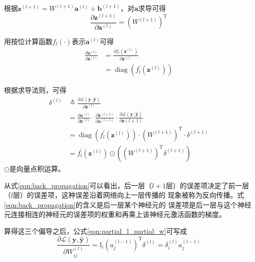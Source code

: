 根据$\mathbf{z}^{(l+1)}=W^{(l+1)} \mathbf{a}^{(l)}+\mathbf{b}^{(l+1)}$，对$\mathbf{a}$求导可得
\begin{equation} 
\frac{\partial \mathbf{z}^{(l+1)}}{\partial \mathbf{a}^{(l)}}=\left(W^{(l+1)}\right)^{\mathrm{T}}
 \end{equation}

用按位计算函数$f_{l}(\cdot)$表示$\mathbf{a}^{(l)}$可得
\begin{equation} 
\begin{aligned} \frac{\partial \mathbf{a}^{(l)}}{\partial \mathbf{z}^{(l)}} &=\frac{\partial f_{l}\left(\mathbf{z}^{(l)}\right)}{\partial \mathbf{z}^{(l)}} \\ &=\operatorname{diag}\left(f_{l}^{\prime}\left(\mathbf{z}^{(l)}\right)\right) \end{aligned}
 \end{equation}

根据求导法则，可得
\begin{equation} 
\label{eqn:back_propagation}
\begin{aligned} \delta^{(l)} & \triangleq \frac{\partial \mathcal{L}(\mathbf{y}, \hat{\mathbf{y}})}{\partial \mathbf{z}^{(l)}} \\ 
&=\frac{\partial \mathbf{a}^{(l)}}{\partial \mathbf{z}^{(l)}} \cdot \frac{\partial \mathbf{z}^{(l+1)}}{\partial \mathbf{a}^{(l+1)}} \cdot \frac{\partial \mathcal{L}(\mathbf{y}, \hat{\mathbf{y}})}{\partial \mathbf{z}(l+1)} \\ 
&=\operatorname{diag}\left(f_{l}^{\prime}\left(\mathbf{z}^{(l)}\right)\right) \cdot\left(W^{(l+1)}\right)^{\mathrm{T}} \cdot \delta^{(l+1)} \\ &=f_{l}^{\prime}\left(\mathbf{z}^{(l)}\right) \odot\left(\left(W^{(l+1)}\right)^{\mathrm{T}} \delta^{(l+1)}\right) \end{aligned}
\end{equation}
$\odot$是向量点积运算。

从式\ref{eqn:back_propagation}可以看出，后一层（$l+1$层）的误差项决定了前一层（$l$层）的误差项，这种误差沿着网络向上一层传播的
现象被称为反向传播。式\ref{eqn:back_propagation}的含义是后一层某个神经元的
误差项是后一层与这个神经元连接相连的神经元的误差项的权重和再乘上该神经元激活函数的梯度。

算得这三个偏导之后，公式\ref{eqn:partial_l_partial_w}可写成
\begin{equation} 
\frac{\partial \mathcal{L}(\mathbf{y}, \hat{\mathbf{y}})}{\partial W_{i j}^{(l)}}=\mathbb{I}_{i}\left(a_{j}^{(l-1)}\right)^{\mathrm{T}} \delta^{(l)}=\delta_{i}^{(l)} a_{j}^{(l-1)}
\end{equation}

